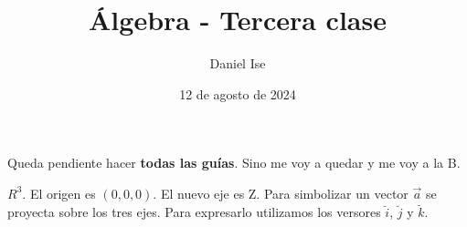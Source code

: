 \documentclass{article}
\title{Álgebra - Tercera clase}
\author{Daniel Ise}
\date{12 de agosto de 2024}
\begin{document}
\maketitle

Queda pendiente hacer \textbf{todas las guías}. Sino me voy a quedar y me voy a 
la B.

\textbf{$R^3$}. El origen es $(0,0,0)$. El nuevo eje es Z. Para simbolizar un
vector $\vec{a}$ se proyecta sobre los tres ejes. Para expresarlo utilizamos los
versores $\breve{i}$, $\breve{j}$ y $\breve{k}$.
\end{document}
